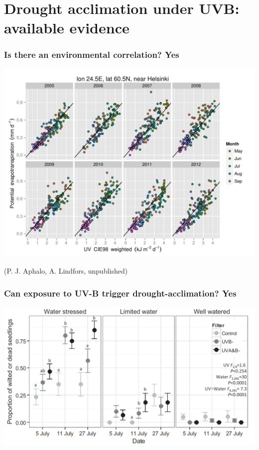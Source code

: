 \documentclass[10pt]{beamer}\usepackage[]{graphicx}\usepackage[]{color}
\begin{document}
%
%
%
%
\section[Drought acclimation under UVB: available evidence]{Drought acclimation under UVB:\\ available evidence}

\begin{frame}
  \frametitle{Is there an environmental correlation? Yes}
  \includegraphics[width=0.8\linewidth]{figures/PET-CIE.pdf}

  (P. J. Aphalo, A. Lindfors, unpublished)
\end{frame}

%
%
\begin{frame}
  \frametitle{Can exposure to UV-B trigger drought-acclimation? Yes}
  \includegraphics[width=\linewidth]{figures/birch-wilt.png}

  \autocite{Robson2014}
\end{frame}
\end{document}
